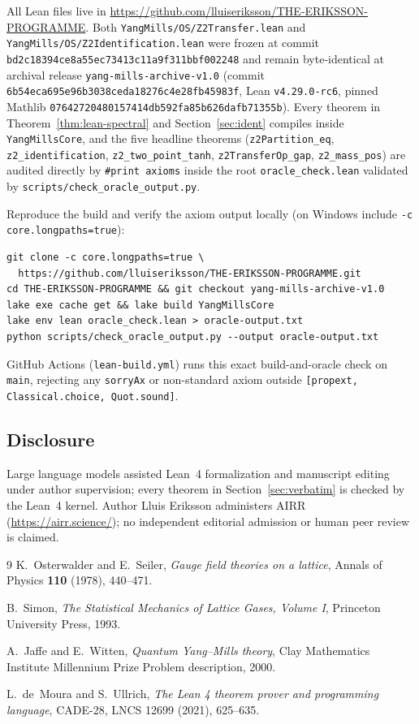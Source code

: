 \documentclass[11pt]{article}
\theoremstyle{remark}
\theoremstyle{definition}
\newcommand{\lean}[1]{\texttt{#1}}
\newcommand{\anchor}{6b54eca695e96b3038ceda18276c4e28fb45983f}
\begin{document}
All Lean files live in \url{https://github.com/lluiseriksson/THE-ERIKSSON-PROGRAMME}.
Both \texttt{YangMills/OS/Z2Transfer.lean} and \texttt{YangMills/OS/Z2Identification.lean}
were frozen at commit \texttt{bd2c18394ce8a55ec73413c11a9f311bbf002248} and remain
byte-identical at archival release \texttt{yang-mills-archive-v1.0} (commit
\texttt{\anchor}, Lean \texttt{v4.29.0-rc6}, pinned Mathlib
\texttt{07642720480157414db592fa85b626dafb71355b}). Every theorem in
Theorem~\ref{thm:lean-spectral} and Section~\ref{sec:ident} compiles inside
\texttt{YangMillsCore}, and the five headline theorems (\lean{z2Partition\_eq},
\lean{z2\_identification}, \lean{z2\_two\_point\_tanh}, \lean{z2TransferOp\_gap},
\lean{z2\_mass\_pos}) are audited directly by \texttt{\#print axioms} inside the root
\texttt{oracle\_check.lean} validated by \texttt{scripts/check\_oracle\_output.py}.

Reproduce the build and verify the axiom output locally (on Windows include
\texttt{-c core.longpaths=true}):
\begin{footnotesize}
\begin{verbatim}
git clone -c core.longpaths=true \
  https://github.com/lluiseriksson/THE-ERIKSSON-PROGRAMME.git
cd THE-ERIKSSON-PROGRAMME && git checkout yang-mills-archive-v1.0
lake exe cache get && lake build YangMillsCore
lake env lean oracle_check.lean > oracle-output.txt
python scripts/check_oracle_output.py --output oracle-output.txt
\end{verbatim}
\end{footnotesize}
GitHub Actions (\texttt{lean-build.yml}) runs this exact build-and-oracle check on
\texttt{main}, rejecting any \texttt{sorryAx} or non-standard axiom outside
\texttt{[propext, Classical.choice, Quot.sound]}.

\subsection*{Disclosure}
Large language models assisted Lean~4 formalization and manuscript editing under author
supervision; every theorem in Section~\ref{sec:verbatim} is checked by the Lean~4 kernel.
Author Lluis Eriksson administers AIRR (\url{https://airr.science/}); no independent
editorial admission or human peer review is claimed.

\begin{thebibliography}{9}\small
{}
K.~Osterwalder and E.~Seiler, \emph{Gauge field theories on a lattice},
Annals of Physics \textbf{110} (1978), 440--471.

B.~Simon, \emph{The Statistical Mechanics of Lattice Gases, Volume I},
Princeton University Press, 1993.

A.~Jaffe and E.~Witten, \emph{Quantum Yang--Mills theory},
Clay Mathematics Institute Millennium Prize Problem description, 2000.

L.~de~Moura and S.~Ullrich, \emph{The Lean 4 theorem prover and programming language},
CADE-28, LNCS 12699 (2021), 625--635.
\end{thebibliography}
\end{document}
